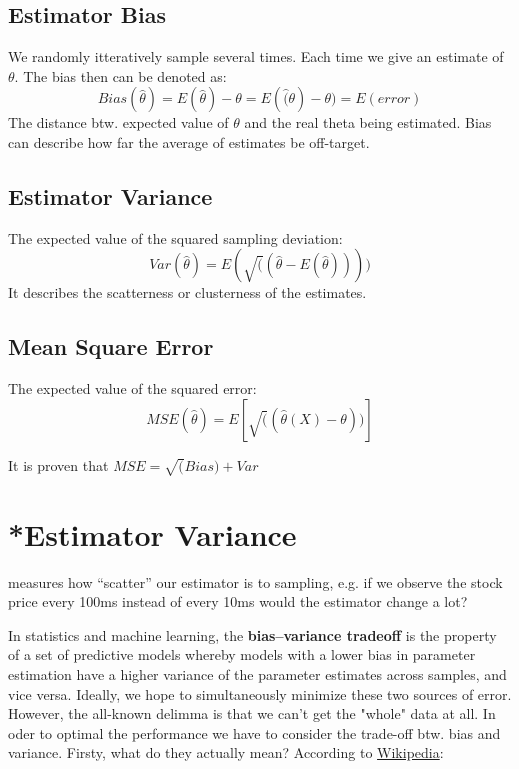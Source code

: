 \documentclass[11pt]{article}
\begin{document}
\subsection{Estimator Bias}
\label{sec-2-2}
We randomly itteratively sample several times. Each time we give an estimate of $\theta$. The bias then can be denoted as:
\begin{equation}
Bias(\hat{\theta}) = E(\hat{\theta})-\theta = E(\hat(\theta)-\theta) =E(error)
\end{equation}
The distance btw. expected value of $\theta$ and the real theta being estimated. Bias can describe how far the average of estimates be off-target.
\subsection{Estimator Variance}
\label{sec-2-3}
The expected value of the squared sampling deviation:
\begin{equation}
Var(\hat{\theta}) = E(\sqrt((\hat{\theta} - E(\hat{\theta}))))
\end{equation}
It describes the scatterness or clusterness of the estimates.

\subsection{Mean Square Error}
\label{sec-2-4}
The expected value of the squared error:
\begin{equation}
MSE(\hat{\theta}) = E[\sqrt((\hat{\theta}(X)-\theta))]
\end{equation}

It is proven that $MSE=\sqrt(Bias) + Var$






\section{*Estimator Variance}
\label{sec-3}
measures how “scatter” our estimator is to sampling, e.g. if we observe the stock price every 100ms instead of every 10ms would the estimator change a lot?

In statistics and machine learning, the \textbf{bias–variance tradeoff} is the property of a set of predictive models whereby models with a lower bias in parameter estimation have a higher variance of the parameter estimates across samples, and vice versa. Ideally, we hope to simultaneously minimize these two sources of error. However, the all-known delimma is that we can't get the "whole" data at all. In oder to optimal the performance we have to consider the trade-off btw. bias and variance. Firsty, what do they actually mean? According to \href{https://en.wikipedia.org/wiki/Bias\%E2\%80\%93variance_tradeoff}{Wikipedia}:
\end{document}
